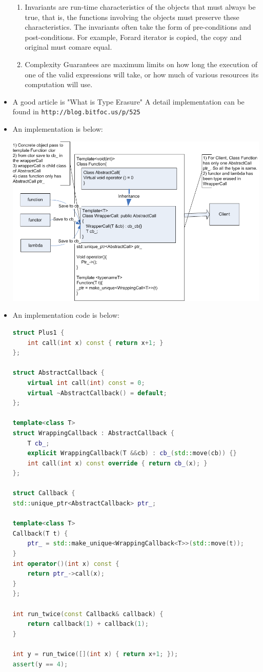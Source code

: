 \documentclass[a4paper,11pt,twoside]{book}
\begin{document}
\begin{itemize}
\begin{enumerate}
	\item Invariants are run-time characteristics of the objects that must always be true, that is, the functions involving the objects must preserve these characteristics. The invariants often take the form of pre-conditions and post-conditions. For example, Forard iterator is copied, the copy and original must comare equal.
	
	\item Complexity Guarantees are maximum limits on how long the execution of one of the valid expressions will take, or how much of various resources its computation will use.
\end{enumerate}

\item A good article is "What is Type Erasure" A detail implementation can be found in \verb|http://blog.bitfoc.us/p/525|
\item An implementation is below:

\includegraphics[scale=0.9]{pics/function1.png}

\item An implementation code is below:
\begin{lstlisting}[frame=single, language=c++]
struct Plus1 {
	int call(int x) const { return x+1; }
};

struct AbstractCallback {
	virtual int call(int) const = 0;
	virtual ~AbstractCallback() = default;
};

template<class T>
struct WrappingCallback : AbstractCallback {
	T cb_;
	explicit WrappingCallback(T &&cb) : cb_(std::move(cb)) {}
	int call(int x) const override { return cb_(x); }
};

struct Callback {
std::unique_ptr<AbstractCallback> ptr_;

template<class T>
Callback(T t) {
	ptr_ = std::make_unique<WrappingCallback<T>>(std::move(t));
}
int operator()(int x) const {
	return ptr_->call(x);
}
};

int run_twice(const Callback& callback) {
	return callback(1) + callback(1);
}

int y = run_twice([](int x) { return x+1; });
assert(y == 4);
\end{lstlisting}


\end{itemize}
\end{document}

